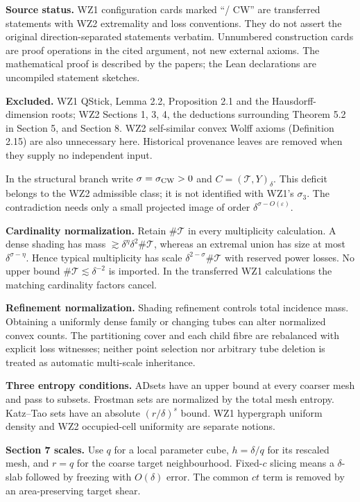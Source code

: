\documentclass[10pt,a4paper]{article}
\newcommand{\sectitle}[1]{\clearpage{\sffamily\Large\bfseries\color{navy}#1}\par\medskip}
\begin{document}
\textbf{Source status.} WZ1 configuration cards marked ``/ CW'' are transferred statements with WZ2 extremality and loss conventions. They do not assert the original direction-separated statements verbatim. Unnumbered construction cards are proof operations in the cited argument, not new external axioms. The mathematical proof is described by the papers; the Lean declarations are uncompiled statement sketches.

\textbf{Excluded.} WZ1 QStick, Lemma 2.2, Proposition 2.1 and the Hausdorff-dimension roots; WZ2 Sections 1, 3, 4, the deductions surrounding Theorem 5.2 in Section 5, and Section 8. WZ2 self-similar convex Wolff axioms (Definition 2.15) are also unnecessary here. Historical provenance leaves are removed when they supply no independent input.
\sectitle{Conventions and porting contracts}
In the structural branch write $\sigma=\sigma_{\rm CW}>0$ and $C=(\mathcal T,Y)_\delta$. This deficit belongs to the WZ2 admissible class; it is not identified with WZ1's $\sigma_3$. The contradiction needs only a small projected image of order $\delta^{\sigma-O(\varepsilon)}$.

\textbf{Cardinality normalization.} Retain $\#\mathcal T$ in every multiplicity calculation. A dense shading has mass $\gtrsim\delta^\eta\delta^2\#\mathcal T$, whereas an extremal union has size at most $\delta^{\sigma-\eta}$. Hence typical multiplicity has scale $\delta^{2-\sigma}\#\mathcal T$ with reserved power losses. No upper bound $\#\mathcal T\lesssim\delta^{-2}$ is imported. In the transferred WZ1 calculations the matching cardinality factors cancel.

\textbf{Refinement normalization.} Shading refinement controls total incidence mass. Obtaining a uniformly dense family or changing tubes can alter normalized convex counts. The partitioning cover and each child fibre are rebalanced with explicit loss witnesses; neither point selection nor arbitrary tube deletion is treated as automatic multi-scale inheritance.

\textbf{Three entropy conditions.} ADsets have an upper bound at every coarser mesh and pass to subsets. Frostman sets are normalized by the total mesh entropy. Katz--Tao sets have an absolute $(r/\delta)^s$ bound. WZ1 hypergraph uniform density and WZ2 occupied-cell uniformity are separate notions.

\textbf{Section 7 scales.} Use $q$ for a local parameter cube, $h=\delta/q$ for its rescaled mesh, and $r=q$ for the coarse target neighbourhood. Fixed-$c$ slicing means a $\delta$-slab followed by freezing with $O(\delta)$ error. The common $ct$ term is removed by an area-preserving target shear.
\end{document}
